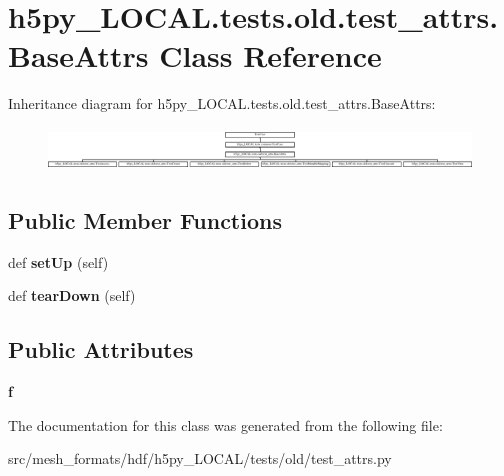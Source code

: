 \hypertarget{classh5py__LOCAL_1_1tests_1_1old_1_1test__attrs_1_1BaseAttrs}{}\section{h5py\+\_\+\+L\+O\+C\+A\+L.\+tests.\+old.\+test\+\_\+attrs.\+Base\+Attrs Class Reference}
\label{classh5py__LOCAL_1_1tests_1_1old_1_1test__attrs_1_1BaseAttrs}
Inheritance diagram for h5py\+\_\+\+L\+O\+C\+A\+L.\+tests.\+old.\+test\+\_\+attrs.\+Base\+Attrs\+:\begin{figure}[H]
\begin{center}
\leavevmode
\includegraphics[height=1.159420cm]{classh5py__LOCAL_1_1tests_1_1old_1_1test__attrs_1_1BaseAttrs}
\end{center}
\end{figure}
\subsection*{Public Member Functions}
\begin{DoxyCompactItemize}
\item 
\mbox{\label{classh5py__LOCAL_1_1tests_1_1old_1_1test__attrs_1_1BaseAttrs_a2851c16da2506df48070af783b251ed1}} 
def {\bfseries set\+Up} (self)
\item 
\mbox{\label{classh5py__LOCAL_1_1tests_1_1old_1_1test__attrs_1_1BaseAttrs_a453cc9d57ab59add871ede8372080009}} 
def {\bfseries tear\+Down} (self)
\end{DoxyCompactItemize}
\subsection*{Public Attributes}
\begin{DoxyCompactItemize}
\item 
\mbox{\label{classh5py__LOCAL_1_1tests_1_1old_1_1test__attrs_1_1BaseAttrs_a06d7e3e65ccca0369edd276fdfa0118e}} 
{\bfseries f}
\end{DoxyCompactItemize}


The documentation for this class was generated from the following file\+:\begin{DoxyCompactItemize}
\item 
src/mesh\+\_\+formats/hdf/h5py\+\_\+\+L\+O\+C\+A\+L/tests/old/test\+\_\+attrs.\+py\end{DoxyCompactItemize}

